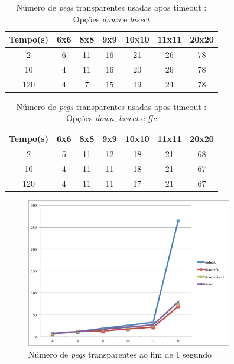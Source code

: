 \documentclass{llncs}
\begin{document}
\setlength{\tabcolsep}{12pt}
\begin{table}[ht!] 
\caption{N\'{u}mero de \emph{pegs} transparentes usadas apos timeout : Op\c{c}\~{o}es \emph{down} e \emph{bisect}} %
\centering %
\begin{tabular}{c c c c c c c} %
\hline\hline %

Tempo(s) & 6x6 & 8x8 & 9x9 & 10x10 & 11x11 & 20x20\\ [0.5ex] %
\hline %
2 & 6 & 11 & 16 & 21 & 26 & 78 \\
10 & 4 & 11 & 16 & 20 & 26 & 78 \\
120 & 4 & 7 & 15 & 19 & 24 & 78 \\[1 ex]
\hline %
\end{tabular} 
\label{tabela:8} %
\end{table}


\setlength{\tabcolsep}{12pt}
\begin{table}[ht!] 
\caption{N\'{u}mero de \emph{pegs} transparentes usadas apos timeout : Op\c{c}\~{o}es \emph{down}, \emph{bisect} e \emph{ffc}} %
\centering %
\begin{tabular}{c c c c c c c} %
\hline\hline %

Tempo(s) & 6x6 & 8x8 & 9x9 & 10x10 & 11x11 & 20x20\\ [0.5ex] %
\hline %
2 & 5 & 11 & 12 & 18 & 21 & 68 \\
10 & 4 & 11 & 11 & 18 & 21 & 67 \\
120 & 4 & 11 & 11 & 17 & 21 & 67 \\[1 ex]
\hline %
\end{tabular} 
\label{tabela:9} %
\end{table}



\begin{figure}[ht]
\centering
\includegraphics[width=90mm]{grafico3.png}
\caption{N\'{u}mero de \emph{pegs} transparentes ao fim de 1 segundo}
\label{graf1}
\end{figure}
\end{document}
